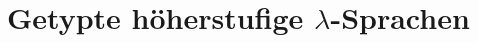 \documentclass[handout,aspectratio=1610,dvipsnames]{beamer}
\begin{document}
  \section[Getypte höherstufige $\lambda$-Sprachen]{Getypte höherstufige $\lambda$-Sprachen}
  \let\woopsi\section\let\section\subsection\let\subsection\subsubsection
  
  \let\subsection\section\let\section\woopsi
\end{document}
